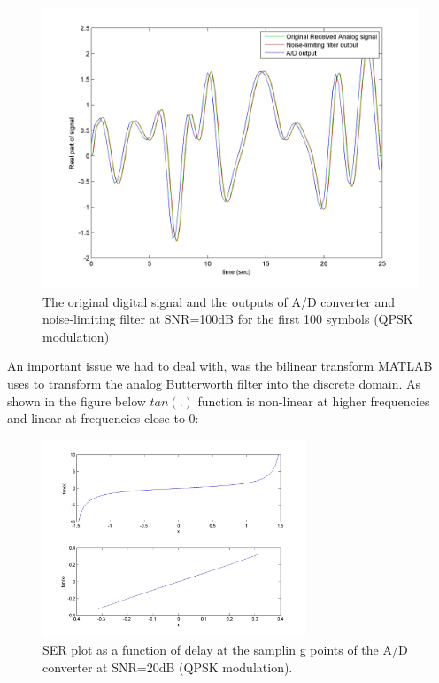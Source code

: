 \documentclass[]{article}
\begin{document}
\begin{figure}[H]
\centering
\includegraphics[width=\textwidth]{AtoD.jpg}
\caption{The original digital signal and the outputs of A/D converter and noise-limiting filter at SNR=100dB for the first 100 symbols (QPSK modulation) \label{fig:atod}}
\end{figure}

\newpage
An important issue we had to deal with, was the bilinear transform MATLAB uses to transform the analog Butterworth filter into the discrete domain. As shown in the figure below $tan(.)$ function is non-linear at higher frequencies and linear at frequencies close to 0:

\begin{figure}[H]
\centering
\hspace*{-2cm}\includegraphics[width=0.7\textwidth]{tan_graph.jpg}
\caption{SER plot as a function of delay at the samplin g points of the A/D converter at SNR=20dB (QPSK modulation). \label{fig:delay}}
\end{figure} 
\end{document}
